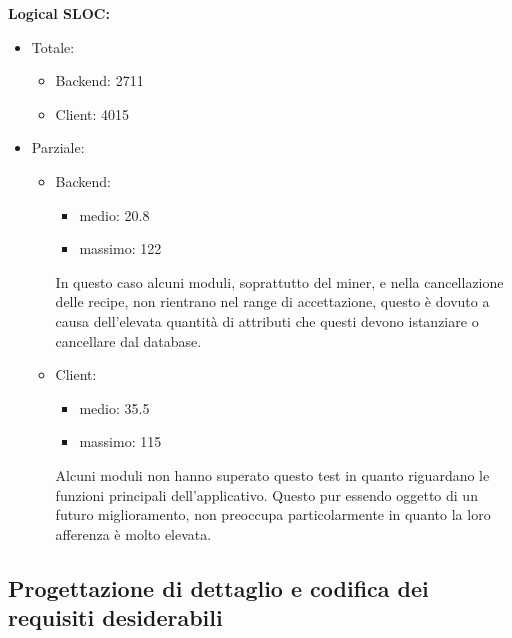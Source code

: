 \begin{description}
				\item \textbf{Logical SLOC:}\\
					\begin{itemize}	
						\item Totale:
							\begin{itemize}
								\item Backend: 2711
								\item Client: 4015
							\end{itemize}
						\item Parziale:
							\begin{itemize}		
								\item Backend:
									\begin{itemize}
										\item medio: 20.8
										\item massimo: 122
									\end{itemize}
					In questo caso alcuni moduli, soprattutto del miner, e nella cancellazione delle recipe, non rientrano nel range di accettazione, questo è dovuto a causa dell’elevata quantità di attributi che questi devono istanziare o cancellare dal database.			
					\item Client:
						\begin{itemize}
							\item medio: 35.5
							\item massimo: 115
						\end{itemize}
					Alcuni moduli non hanno superato questo test in quanto riguardano le funzioni principali dell'applicativo. Questo pur essendo oggetto di un futuro miglioramento, non preoccupa particolarmente in quanto la loro afferenza è molto elevata.
					\end{itemize}
					\end{itemize}
			\end{description}
					
	\subsection{Progettazione di dettaglio e codifica dei requisiti desiderabili}
